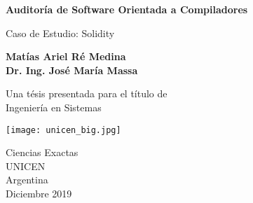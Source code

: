 \begin{titlepage}
    \begin{center}
        \vspace*{1cm}
 
        \Large
        \textbf{Auditoría de Software Orientada a Compiladores}
 
        \vspace{0.3cm}
        \Large
        {Caso de Estudio: Solidity}
 
        \vspace{1.5cm}
        
        \large
        \textbf{{Matías Ariel Ré Medina}\\
        {Dr. Ing. José María Massa}
        }
 
        \vfill
 
        Una tésis presentada para el título de\\
        Ingeniería en Sistemas
 
        \vspace{0.8cm}
 
        {\texttt{[image: unicen\_big.jpg]}}
        \vspace*{0.3cm}

        \large
        Ciencias Exactas\\
        UNICEN\\
        Argentina\\
        Diciembre 2019
 
    \end{center}
\end{titlepage}
